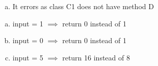 \documentclass[11pt]{article}
\begin{document}
\begin{enumerate}[a)]
\item It errors as class C1 does not have method D

\end{enumerate}




\begin{enumerate}[a)]

	\item input = 1 $\implies$ return 0 instead of 1
	
	\item input = 0 $\implies$ return 0 instead of 1
	
	\item input = 5 $\implies$ return 16 instead of 8

\end{enumerate}
\end{document}
